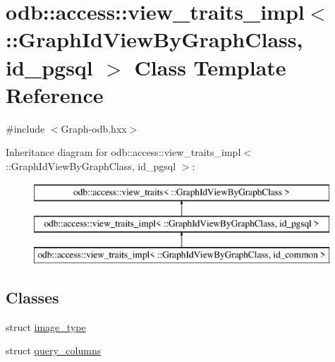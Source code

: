 \hypertarget{classodb_1_1access_1_1view__traits__impl_3_01_1_1_graph_id_view_by_graph_class_00_01id__pgsql_01_4}{}\section{odb\+:\+:access\+:\+:view\+\_\+traits\+\_\+impl$<$ \+:\+:Graph\+Id\+View\+By\+Graph\+Class, id\+\_\+pgsql $>$ Class Template Reference}
\label{classodb_1_1access_1_1view__traits__impl_3_01_1_1_graph_id_view_by_graph_class_00_01id__pgsql_01_4}


{\ttfamily \#include $<$Graph-\/odb.\+hxx$>$}

Inheritance diagram for odb\+:\+:access\+:\+:view\+\_\+traits\+\_\+impl$<$ \+:\+:Graph\+Id\+View\+By\+Graph\+Class, id\+\_\+pgsql $>$\+:\begin{figure}[H]
\begin{center}
\leavevmode
\includegraphics[height=3.000000cm]{dd/d11/classodb_1_1access_1_1view__traits__impl_3_01_1_1_graph_id_view_by_graph_class_00_01id__pgsql_01_4}
\end{center}
\end{figure}
\subsection*{Classes}
\begin{DoxyCompactItemize}
\item 
struct \hyperlink{structodb_1_1access_1_1view__traits__impl_3_01_1_1_graph_id_view_by_graph_class_00_01id__pgsql_01_4_1_1image__type}{image\+\_\+type}
\item 
struct \hyperlink{structodb_1_1access_1_1view__traits__impl_3_01_1_1_graph_id_view_by_graph_class_00_01id__pgsql_01_4_1_1query__columns}{query\+\_\+columns}
\end{DoxyCompactItemize}
